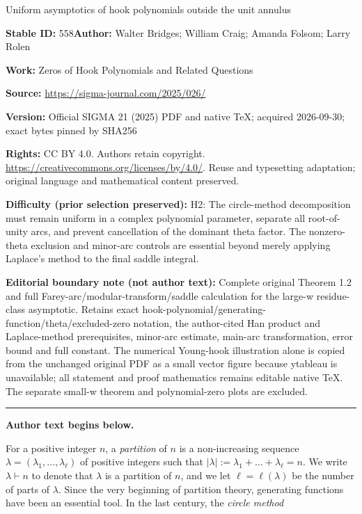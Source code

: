 \documentclass[11pt]{article}
\numberwithin{equation}{section}
\def\lp{\left(}
\def\rp{\right)}
\begin{document}
\begin{center}\Large Uniform asymptotics of hook polynomials outside the unit annulus\end{center}
\noindent\textbf{Stable ID:} 558\quad\textbf{Author:} Walter Bridges; William Craig; Amanda Folsom; Larry Rolen\par
\noindent\textbf{Work:} Zeros of Hook Polynomials and Related Questions\par
\noindent\textbf{Source:} \url{https://sigma-journal.com/2025/026/}\par
\noindent\textbf{Version:} Official SIGMA 21 (2025) PDF and native TeX; acquired 2026-09-30; exact bytes pinned by SHA256\par
\noindent\textbf{Rights:} CC BY 4.0. Authors retain copyright. \url{https://creativecommons.org/licenses/by/4.0/}. Reuse and typesetting adaptation; original language and mathematical content preserved.\par
\noindent\textbf{Difficulty (prior selection preserved):} {\CJKfont H2: The circle-method decomposition must remain uniform in a complex polynomial parameter, separate all root-of-unity arcs, and prevent cancellation of the dominant theta factor. The nonzero-theta exclusion and minor-arc controls are essential beyond merely applying Laplace’s method to the final saddle integral.}\par
\medskip\noindent\textbf{Editorial boundary note (not author text):} Complete original Theorem 1.2 and full Farey-arc/modular-transform/saddle calculation for the large-w residue-class asymptotic. Retains exact hook-polynomial/generating-function/theta/excluded-zero notation, the author-cited Han product and Laplace-method prerequisites, minor-arc estimate, main-arc transformation, error bound and full constant. The numerical Young-hook illustration alone is copied from the unchanged original PDF as a small vector figure because ytableau is unavailable; all statement and proof mathematics remains editable native TeX. The separate small-w theorem and polynomial-zero plots are excluded.\par
\medskip\hrule\medskip\noindent\textbf{Author text begins below.}\par
\setcounter{section}{1}
For a positive integer $n$, a {\it partition} of $n$ is a non-increasing sequence $\lambda = \lp \lambda_1, \dots, \lambda_\ell \rp$ of positive integers such that $|\lambda| := \lambda_1 + \dots + \lambda_\ell = n$. We write $\lambda \vdash n$ to denote that $\lambda$ is a partition of $n$, and we let $\ell = \ell\lp \lambda \rp$ be the number of parts of $\lambda$. Since the very beginning of partition theory, generating functions have been an essential tool. In the last century, the {\it circle method}
\end{document}
